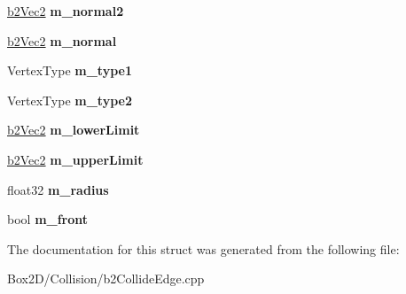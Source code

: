 \begin{DoxyCompactItemize}
\hyperlink{structb2_vec2}{b2\+Vec2} {\bfseries m\+\_\+normal2}
\item 
\mbox{\label{structb2_e_p_collider_a67ff23f9fada3a733928380da8653348}} 
\hyperlink{structb2_vec2}{b2\+Vec2} {\bfseries m\+\_\+normal}
\item 
\mbox{\label{structb2_e_p_collider_ad2541e4c9358d5ffcaca19b25836392b}} 
Vertex\+Type {\bfseries m\+\_\+type1}
\item 
\mbox{\label{structb2_e_p_collider_a71889f34bef412e3cbfbbab605210b7e}} 
Vertex\+Type {\bfseries m\+\_\+type2}
\item 
\mbox{\label{structb2_e_p_collider_a6b48818ac312de825aaf55b46aceea1e}} 
\hyperlink{structb2_vec2}{b2\+Vec2} {\bfseries m\+\_\+lower\+Limit}
\item 
\mbox{\label{structb2_e_p_collider_a5da77944d10d87ca7222e3d8d00ac205}} 
\hyperlink{structb2_vec2}{b2\+Vec2} {\bfseries m\+\_\+upper\+Limit}
\item 
\mbox{\label{structb2_e_p_collider_a1efd359a8c17680bbdef093dd07fbb9d}} 
float32 {\bfseries m\+\_\+radius}
\item 
\mbox{\label{structb2_e_p_collider_aa9443e27e043bf80916992ca96bdedd2}} 
bool {\bfseries m\+\_\+front}
\end{DoxyCompactItemize}


The documentation for this struct was generated from the following file\+:\begin{DoxyCompactItemize}
\item 
Box2\+D/\+Collision/b2\+Collide\+Edge.\+cpp\end{DoxyCompactItemize}
